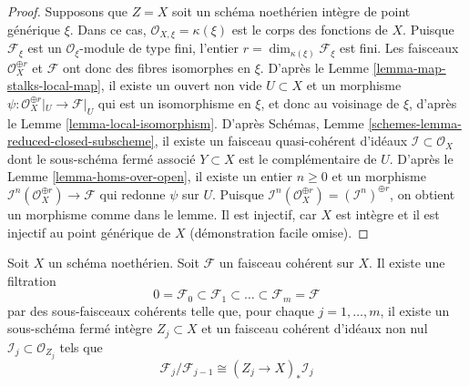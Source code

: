 \begin{proof}
\medskip\noindent
Supposons que $Z = X$ soit un schéma noethérien intègre de point générique $\xi$.
Dans ce cas, $\mathcal{O}_{X, \xi} = \kappa(\xi)$ est le corps des fonctions de $X$.
Puisque $\mathcal{F}_\xi$ est un $\mathcal{O}_\xi$-module de type fini,
l'entier $r = \dim_{\kappa(\xi)} \mathcal{F}_\xi$ est fini.
Les faisceaux $\mathcal{O}_X^{\oplus r}$ et $\mathcal{F}$
ont donc des fibres isomorphes en $\xi$.
D'après le Lemme \ref{lemma-map-stalks-local-map}, il existe un
ouvert non vide $U \subset X$ et un morphisme
$\psi : \mathcal{O}_X^{\oplus r}|_U \to \mathcal{F}|_U$
qui est un isomorphisme
en $\xi$, et donc au voisinage de $\xi$, d'après le
Lemme \ref{lemma-local-isomorphism}.
D'après Schémas, Lemme \ref{schemes-lemma-reduced-closed-subscheme},
il existe un faisceau quasi-cohérent d'idéaux
$\mathcal{I} \subset \mathcal{O}_X$
dont le sous-schéma fermé associé $Y \subset X$ est le complémentaire
de $U$.
D'après le Lemme \ref{lemma-homs-over-open}, il existe un entier $n \geq 0$ et un morphisme
$\mathcal{I}^n(\mathcal{O}_X^{\oplus r}) \to \mathcal{F}$
qui redonne $\psi$ sur $U$. Puisque
$\mathcal{I}^n(\mathcal{O}_X^{\oplus r}) = (\mathcal{I}^n)^{\oplus r}$,
on obtient un morphisme comme dans le lemme. Il est injectif, car $X$ est
intègre et il est injectif au point générique de $X$
(démonstration facile omise).
\end{proof}

\begin{lemma}
\label{lemma-coherent-filter}
Soit $X$ un schéma noethérien.
Soit $\mathcal{F}$ un faisceau cohérent sur $X$.
Il existe une filtration
$$
0 = \mathcal{F}_0 \subset \mathcal{F}_1 \subset
\ldots \subset \mathcal{F}_m = \mathcal{F}
$$
par des sous-faisceaux cohérents telle que, pour chaque $j = 1, \ldots, m$,
il existe un sous-schéma fermé intègre $Z_j \subset X$ et
un faisceau cohérent d'idéaux non nul $\mathcal{I}_j \subset \mathcal{O}_{Z_j}$
tels que
$$
\mathcal{F}_j/\mathcal{F}_{j - 1}
\cong (Z_j \to X)_* \mathcal{I}_j
$$
\end{lemma}

